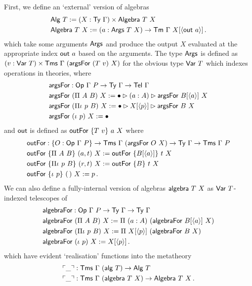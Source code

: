 First, we define an `external' version of algebras
\begin{align*}
    &\mta{Alg}\ T := (X : \Ty\ \Gamma) \times \mta{Algebra}\ T\ X \\
    &\mta{Algebra}\ T\ X := (a : \mta{Args}\ T\ X) \to \Tm\ \Gamma\ X[\Msub{\mta{out}\ a}] \,.
\end{align*}
which take some arguments $\textsf{Args}$ and produce the output $X$
evaluated at the appropriate index $\mta{out}\ a$ based on the arguments. The
type $\textsf{Args}$ is defined as $(v : \textsf{Var}\ T) \times \textsf{Tms}\ \Gamma\
(\textsf{argsFor}\ (T\ v)\ X)$ for the obvious type $\textsf{Var}\ T$ which indexes
operations in theories, where
\begin{align*}
    &\mta{argsFor} : \mta{Op}\ \Gamma\ P \to \Ty\ \Gamma \to \Tel\ \Gamma \\
    &\mta{argsFor}\ (\Pi\ A\ B)\ X := \bullet \rhd (a : A) \rhd \mta{argsFor}\ B[\Msub a]\ X \\
    &\mta{argsFor}\ (\Pi\iota\ p\ B)\ X := \bullet \rhd X[\Msub p] \rhd \mta{argsFor}\ B\ X \\
    &\mta{argsFor}\ (\iota\ p)\ X := \bullet
\end{align*}
and $\textsf{out}$ is defined as $\mta{outFor}\ \{T\ v\}\ a\ X$ where
\begin{align*}
    &\mta{outFor} : \{O : \Op\ \Gamma\ P\} \to \Tms\ \Gamma\ (\mta{argsFor}\ O\ X) \to \Ty\ \Gamma \to \Tms\ \Gamma\ P \\
    &\mta{outFor}\ \{\Pi\ A\ B\}\ (a, t)\ X := \mta{outFor}\ \{B[\Msub a]\}\ t\ X \\
    &\mta{outFor}\ \{\Pi\iota\ p\ B\}\ (r, t)\ X := \mta{outFor}\ \{B\}\ t\ X \\
    &\mta{outFor}\ \{\iota\ p\}\ (\,)\ X := p \,.
\end{align*}
We can also define a fully-internal version of algebras $\textsf{algebra}\ T\ X$ as $\textsf{Var}\ T$-indexed telescopes of
\begin{align*}
    &\mta{algebraFor} : \mta{Op}\ \Gamma\ P \to \Ty\ \Gamma \to \Ty\ \Gamma \\
    &\mta{algebraFor}\ (\Pi\ A\ B)\ X := \Pi\ (a : A)\ (\mta{algebraFor}\ B[\Msub a]\ X) \\
    &\mta{algebraFor}\ (\Pi\iota\ p\ B)\ X := \Pi\ X[\Msub p]\ (\mta{algebraFor}\ B\ X) \\
    &\mta{algebraFor}\ (\iota\ p)\ X := X[\Msub p] \,.
\end{align*}
which have evident `realisation' functions into the metatheory
\begin{align*}
    &\ulcorner \_ \urcorner : \textsf{Tms}\ \Gamma\ (\textsf{alg}\ T) \to \textsf{Alg}\ T \\
    &\ulcorner \_ \urcorner : \textsf{Tms}\ \Gamma\ (\textsf{algebra}\ T\ X) \to \textsf{Algebra}\ T\ X \,.
\end{align*}

